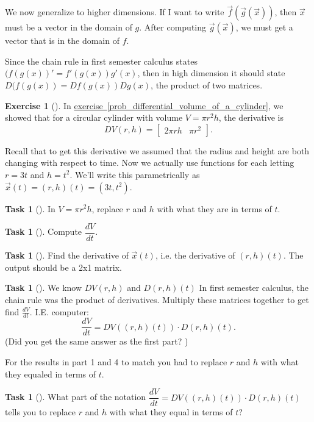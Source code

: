 \documentclass[10pt,]{book}
\theoremstyle{plain}
\theoremstyle{definition}
\theoremstyle{definition}
\theoremstyle{definition}
\theoremstyle{definition}
\newtheorem{exploration}[project]{Exercise}
\newtheorem{task}[project]{Task}
\theoremstyle{definition}
\numberwithin{equation}{section}
\newcommand{\amp}{&}
\begin{document}
We now generalize to higher dimensions. If I want to write \(\vec f(\vec g(\vec x))\), then \(\vec x\) must be a vector in the domain of \(g\). After computing \(\vec g(\vec x)\), we must get a vector that is in the domain of \(f\).%
\par
Since the chain rule in first semester calculus states \((f(g(x))'=f'(g(x))g'(x)\), then in high dimension it should state \(D(f(g(x)) = Df(g(x))Dg(x)\), the product of two matrices.%
\begin{exploration}[]\label{chain_rule_two}
In \hyperref[prob_differential_volume_of_a_cylinder]{exercise~\ref{prob_differential_volume_of_a_cylinder}}, we showed that for a circular cylinder with volume \(V=\pi r^2 h\), the derivative is%
\begin{equation*}
DV(r,h)=\begin{bmatrix}2\pi rh \amp  \pi r^2
\end{bmatrix} .
\end{equation*}
%
\par
Recall that to get this derivative we assumed that the radius and height are both changing with respect to time. Now we actually use functions for each letting \(r=3t\) and \(h=t^2\). We'll write this parametrically as \(\vec x (t) = (r,h)(t) = (3t, t^2)\).%
\begin{task}[]\label{task-336}
In \(V=\pi r^2 h\), replace \(r\) and \(h\) with what they are in terms of \(t\).%
\end{task}
\begin{task}[]\label{task-337}
Compute \(\dfrac{dV}{dt}\).%
\end{task}
\begin{task}[]\label{task-338}
Find the derivative of \(\vec x (t)\), i.e. the derivative of \((r,h)(t)\). The output should be a 2x1 matrix.%
%
\end{task}
\begin{task}[]\label{task-339}
We know \(DV(r,h)\) and \(D(r,h)(t)\) In first semester calculus, the chain rule was the product of derivatives. Multiply these matrices together to get find \(\frac{dV}{dt}\). I.E. computer:%
\begin{equation*}
\dfrac{dV}{dt}=DV((r,h)(t))\cdot D(r,h)(t).
\end{equation*}
(Did you get the same answer as the first part? )%
\end{task}
For the results in part 1 and 4 to match you had to replace \(r\) and \(h\) with what they equaled in terms of \(t\).%
\begin{task}[]\label{task-340}
What part of the notation \(\dfrac{dV}{dt}=DV((r,h)(t))\cdot D(r,h)(t)\) tells you to replace \(r\) and \(h\) with what they equal in terms of \(t\)?%
\end{task}
\end{exploration}
\end{document}
